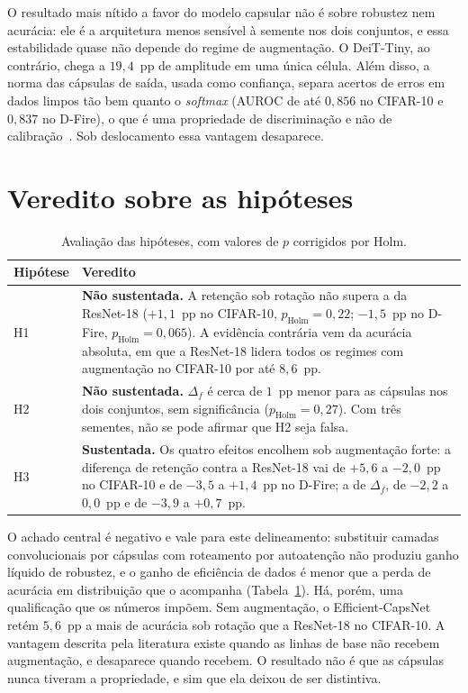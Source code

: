 O resultado mais nítido a favor do modelo capsular não é sobre robustez nem
acurácia: ele é a arquitetura menos sensível à semente nos dois conjuntos, e
essa estabilidade quase não depende do regime de augmentação. O DeiT-Tiny, ao
contrário, chega a $19{,}4$~pp de amplitude em uma única célula. Além disso, a
norma das cápsulas de saída, usada como confiança, separa acertos de erros em
dados limpos tão bem quanto o \emph{softmax} (AUROC de até $0{,}856$ no CIFAR-10
e $0{,}837$ no D-Fire), o que é uma propriedade de discriminação e não de
calibração~\cite{guo2017calibration}. Sob deslocamento essa vantagem desaparece.

\section{Veredito sobre as hipóteses}
\label{sec:res:verdict}

\begin{table}[htb]
  \centering
  \caption{Avaliação das hipóteses, com valores de $p$ corrigidos por Holm.}
  \label{tab:res-verdict}
  \small
  \begin{tabular}{l p{}}
    \toprule
    Hipótese & Veredito \\
    \midrule
    H1 & \textbf{Não sustentada.} A retenção sob rotação não supera a da
    ResNet-18 ($+1{,}1$~pp no CIFAR-10, $p_{\text{Holm}} = 0{,}22$; $-1{,}5$~pp
    no D-Fire, $p_{\text{Holm}} = 0{,}065$). A evidência contrária vem da
    acurácia absoluta, em que a ResNet-18 lidera todos os regimes com
    augmentação no CIFAR-10 por até $8{,}6$~pp. \\
    \addlinespace
    H2 & \textbf{Não sustentada.} $\Delta_f$ é cerca de $1$~pp menor para as
    cápsulas nos dois conjuntos, sem significância ($p_{\text{Holm}} = 0{,}27$).
    Com três sementes, não se pode afirmar que H2 seja falsa. \\
    \addlinespace
    H3 & \textbf{Sustentada.} Os quatro efeitos encolhem sob augmentação forte:
    a diferença de retenção contra a ResNet-18 vai de $+5{,}6$ a $-2{,}0$~pp no
    CIFAR-10 e de $-3{,}5$ a $+1{,}4$~pp no D-Fire; a de $\Delta_f$, de $-2{,}2$
    a $0{,}0$~pp e de $-3{,}9$ a $+0{,}7$~pp. \\
    \bottomrule
  \end{tabular}
\end{table}

O achado central é negativo e vale para este delineamento: substituir camadas
convolucionais por cápsulas com roteamento por autoatenção não produziu ganho
líquido de robustez, e o ganho de eficiência de dados é menor que a perda de
acurácia em distribuição que o acompanha (Tabela~\ref{tab:res-verdict}). Há,
porém, uma qualificação que os números impõem. Sem augmentação, o
Efficient-CapsNet retém $5{,}6$~pp a mais de acurácia sob rotação que a
ResNet-18 no CIFAR-10. A vantagem descrita pela literatura existe quando as
linhas de base não recebem augmentação, e desaparece quando recebem. O resultado
não é que as cápsulas nunca tiveram a propriedade, e sim que ela deixou de ser
distintiva.